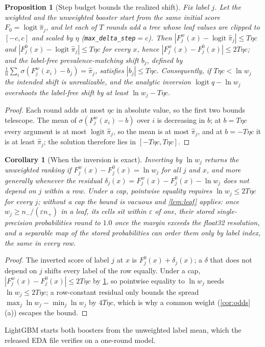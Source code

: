 \documentclass[sigconf,nonacm]{acmart}
\newtheorem{proposition}{Proposition}
\newtheorem{corollary}{Corollary}
\begin{document}
\begin{proposition}[Step budget bounds the realized shift]
\label{prop:budget}
Fix label $j$. Let the weighted and the unweighted booster start from the same initial score $F_0=\operatorname{logit}\hat\pi_j$, and let each of $T$ rounds add a tree whose leaf values are clipped to $[-c,c]$ and scaled by $\eta$ (\texttt{max\_delta\_step}$=c$). Then $|F^{w}_j(x)-\operatorname{logit}\hat\pi_j|\le T\eta c$ and $|F^{0}_j(x)-\operatorname{logit}\hat\pi_j|\le T\eta c$ for every $x$, hence $|F^{w}_j(x)-F^{0}_j(x)|\le 2T\eta c$; and the label-free prevalence-matching shift $b_j$, defined by $\frac1n\sum_i\sigma(F^{w}_j(x_i)-b_j)=\hat\pi_j$, satisfies $|b_j|\le T\eta c$. Consequently, if $T\eta c<\ln w_j$ the intended shift is unrealizable, and the analytic inversion $\operatorname{logit}q-\ln w_j$ overshoots the label-free shift by at least $\ln w_j-T\eta c$.
\end{proposition}
\begin{proof}
Each round adds at most $\eta c$ in absolute value, so the first two bounds telescope. The mean of $\sigma(F^{w}_j(x_i)-b)$ over $i$ is decreasing in $b$; at $b=T\eta c$ every argument is at most $\operatorname{logit}\hat\pi_j$, so the mean is at most $\hat\pi_j$, and at $b=-T\eta c$ it is at least $\hat\pi_j$; the solution therefore lies in $[-T\eta c,T\eta c]$.
\end{proof}
\begin{corollary}[When the inversion is exact]
\label{cor:exact}
Inverting by $\ln w_j$ returns the unweighted ranking if $F^{w}_j(x)-F^{0}_j(x)=\ln w_j$ for all $j$ and $x$, and more generally whenever the residual $\delta_j(x)=F^{w}_j(x)-F^{0}_j(x)-\ln w_j$ does not depend on $j$ within a row. Under a cap, pointwise equality requires $\ln w_j\le 2T\eta c$ for every $j$; without a cap the bound is vacuous and \cref{lem:leaf} applies: once $w_j\ge n_-/(\varepsilon n_+)$ in a leaf, its cells sit within $\varepsilon$ of one, their stored single-precision probabilities round to $1.0$ once the margin exceeds the float32 resolution, and a separable map of the stored probabilities can order them only by label index, the same in every row.
\end{corollary}
\begin{proof}
The inverted score of label $j$ at $x$ is $F^{0}_j(x)+\delta_j(x)$; a $\delta$ that does not depend on $j$ shifts every label of the row equally. Under a cap, $|F^{w}_j(x)-F^{0}_j(x)|\le 2T\eta c$ by \cref{prop:budget}, so pointwise equality to $\ln w_j$ needs $\ln w_j\le 2T\eta c$; a row-constant residual only bounds the spread $\max_j\ln w_j-\min_j\ln w_j$ by $4T\eta c$, which is why a common weight (\cref{cor:odds}(a)) escapes the bound.
\end{proof}
LightGBM starts both boosters from the unweighted label mean, which the released EDA file verifies on a one-round model.
\end{document}

